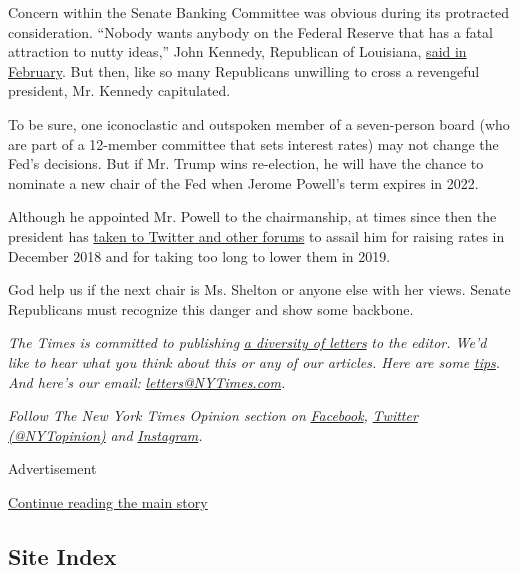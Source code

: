 Concern within the Senate Banking Committee was obvious during its
protracted consideration. ``Nobody wants anybody on the Federal Reserve
that has a fatal attraction to nutty ideas,'' John Kennedy, Republican
of Louisiana,
\href{https://www.wsj.com/articles/republican-senator-raises-concerns-over-sheltons-fed-candidacy-11581608467}{said
in February}. But then, like so many Republicans unwilling to cross a
revengeful president, Mr. Kennedy capitulated.

To be sure, one iconoclastic and outspoken member of a seven-person
board (who are part of a 12-member committee that sets interest rates)
may not change the Fed's decisions. But if Mr. Trump wins re-election,
he will have the chance to nominate a new chair of the Fed when Jerome
Powell's term expires in 2022.

Although he appointed Mr. Powell to the chairmanship, at times since
then the president has
\href{https://www.nytimes3xbfgragh.onion/2019/06/24/business/economy/federal-reserve-trump.html?action=click\&module=Intentional\&pgtype=Article}{taken
to Twitter and other forums} to assail him for raising rates in December
2018 and for taking too long to lower them in 2019.

God help us if the next chair is Ms. Shelton or anyone else with her
views. Senate Republicans must recognize this danger and show some
backbone.

\emph{The Times is committed to publishing}
\href{https://www.nytimes3xbfgragh.onion/2019/01/31/opinion/letters/letters-to-editor-new-york-times-women.html}{\emph{a
diversity of letters}} \emph{to the editor. We'd like to hear what you
think about this or any of our articles. Here are some}
\href{https://help.nytimes3xbfgragh.onion/hc/en-us/articles/115014925288-How-to-submit-a-letter-to-the-editor}{\emph{tips}}\emph{.
And here's our email:}
\href{mailto:letters@NYTimes.com}{\emph{letters@NYTimes.com}}\emph{.}

\emph{Follow The New York Times Opinion section on}
\href{https://www.facebookcorewwwi.onion/nytopinion}{\emph{Facebook}}\emph{,}
\href{http://twitter.com/NYTOpinion}{\emph{Twitter (@NYTopinion)}}
\emph{and}
\href{https://www.instagram.com/nytopinion/}{\emph{Instagram}}\emph{.}

Advertisement

\protect\hyperlink{after-bottom}{Continue reading the main story}

\hypertarget{site-index}{%
\subsection{Site Index}\label{site-index}}


